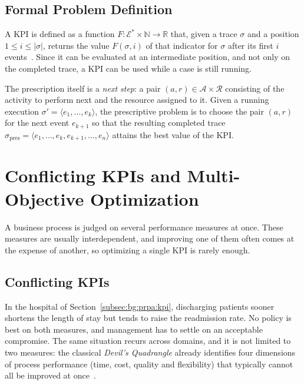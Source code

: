 \subsection{Formal Problem Definition}
    \label{subsec:bg:prpa:formal}
    A KPI is defined as a function $F : \mathcal{E}^{*} \times \mathbb{N} \to \mathbb{R}$ that,
    given a trace $\sigma$ and a position $1 \le i \le |\sigma|$, returns the
    value $F(\sigma, i)$ of that indicator for $\sigma$ after its first $i$
    events~\cite{le2025balancing}. Since it can be evaluated at an
    intermediate position, and not only on the completed trace, a KPI can be
    used while a case is still running.

    The prescription itself is a \emph{next step}: a pair
    $(a, r) \in \mathcal{A} \times \mathcal{R}$ consisting of the activity to
    perform next and the resource assigned to it. Given a running execution
    $\sigma' = \langle e_1, \dots, e_k \rangle$, the prescriptive problem is to
    choose the pair $(a, r)$ for the next event $e_{k+1}$ so that the
    resulting completed trace
    $\sigma_{\mathrm{pres}} = \langle e_1, \dots, e_k, e_{k+1}, \dots, e_n
    \rangle$ attains the best value of the KPI.

\section{Conflicting KPIs and Multi-Objective Optimization}
\label{sec:bg:moo}

A business process is judged on several performance measures at once. These
measures are usually interdependent, and improving one of them often comes at
the expense of another, so optimizing a single KPI is rarely enough.

\subsection{Conflicting KPIs}
    \label{subsec:bg:moo:devil}
    In the hospital of Section~\ref{subsec:bg:prpa:kpi}, discharging patients
    sooner shortens the length of stay but tends to raise the readmission
    rate. No policy is best on both measures, and management has to settle on
    an acceptable compromise. The same situation recurs across domains, and it
    is not limited to two measures:
    the classical \emph{Devil's Quadrangle} already identifies four dimensions of
    process performance (time, cost, quality and flexibility) that
    typically cannot all be improved at once~\cite{dumas2018}.
    
